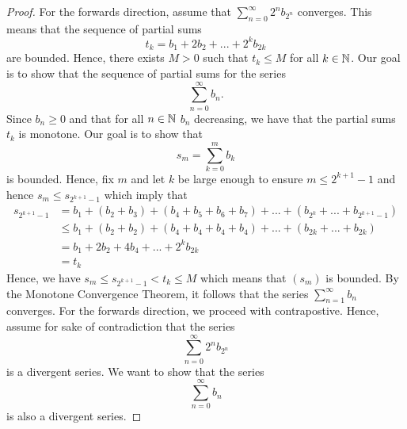 \begin{proof}
    For the forwards direction, assume that \( \sum_{n=0}^{ \infty} 2^n b_{2^n}\) converges. This means that the sequence of partial sums 
    \[ t_k = b_1 + 2b_2 + ... + 2^k b_{2k}\] are bounded. Hence, there exists \( M > 0 \) such that \( t_k \leq M \) for all \( k \in \mathbb{N} \). Our goal is to show that the sequence of partial sums for the series 
    \[ \sum_{n=0}^{ \infty} b_n.\] 
     Since \( b_n \geq 0 \) and that for all \( n \in \mathbb{N} \) \( b_n \) decreasing, we have that the partial sums \( t_k \) is monotone. Our goal is to show that 
     \[ s_m = \sum_{k=0}^{m} b_k  \]
     is bounded. Hence, fix \( m\) and let \( k \) be large enough to ensure \( m \leq 2^{k+1} - 1\) and hence \( s_m \leq s_{2^{k+1} - 1}\) which imply that 
     \begin{align*}
         s_{2^{k+1}-1}&= b_1 + (b_2 + b_3) + (b_4 + b_5 + b_6 + b_7 ) + ... + (b_{2^k} + ... + b_{2^{k+1}-1})\\ 
                      &\leq b_1 + (b_2 + b_2) + (b_4 + b_4 + b_4 + b_4) + ... + (b_{2k} + ... + b_{2k}) \\
                      &= b_1 + 2b_2 + 4b_4 + ... + 2^k b_{2k} \\
                      &= t_k 
     \end{align*}
     Hence, we have \( s_m \leq s_{2^{k+1} - 1} < t_k \leq M \) which means that \( (s_m)\) is bounded. By the Monotone Convergence Theorem, it follows that the series \( \sum_{n=1}^{ \infty} b_n \) converges. 
     For the forwards direction, we proceed with contrapostive. Hence, assume for sake of contradiction that the series 
     \[ \sum_{n=0}^{ \infty} 2^n b_{2^n}\]
     is a divergent series. We want to show that the series 
     \[ \sum_{n=0}^{ \infty} b_n \]
     is also a divergent series.
\end{proof}

